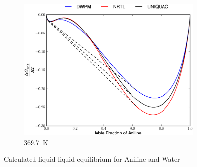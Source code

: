 \vspace*{\fill}
\clearpage
\begin{figure}[hpt]
\ContinuedFloat 
\begin{subfigure}[h]{0.5\textwidth}
\centering
\includegraphics[width = \textwidth]{Results_Parts/BinaryParams/aniline-water/AllModelsGibbsPlots/T_369.7.eps}
\caption{369.7~$\mathrm{K}$}
\end{subfigure}%
\caption[]{Calculated liquid-liquid equilibrium for Aniline and Water}
\end{figure}
\clearpage


